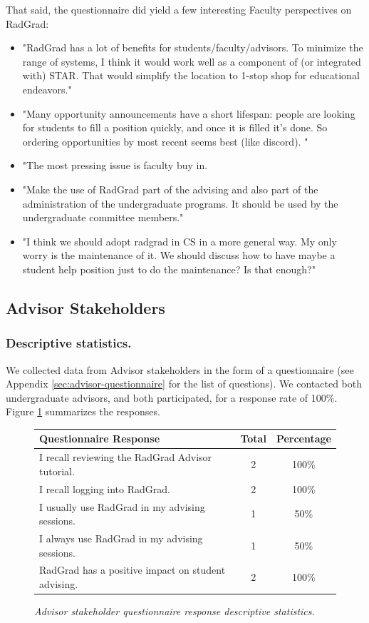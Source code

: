 \documentclass[acmsmall]{acmart}
\begin{document}
That said, the questionnaire did yield a few interesting Faculty perspectives on RadGrad:

\begin{itemize}[leftmargin=*]
\item "RadGrad has a lot of benefits for students/faculty/advisors. To minimize the range of systems, I think it would work well as a component of (or integrated with) STAR. That would simplify the location to 1-stop shop for educational endeavors."
\item "Many opportunity announcements have a short lifespan: people are looking for students to fill a position quickly, and once it is filled it's done. So ordering opportunities by most recent seems best (like discord). "
\item "The most pressing issue is faculty buy in.
\item "Make the use of RadGrad part of the advising and also part of the administration of the undergraduate programs. It should be used by the undergraduate committee members."
\item "I think we should adopt radgrad in CS in a more general way. My only worry is the maintenance of it. We should discuss how to have maybe a student help position just to do the maintenance? Is that enough?"
\end{itemize}

\subsection{Advisor Stakeholders}

\subsubsection{Descriptive statistics.} We collected data from Advisor stakeholders in the form of a questionnaire (see Appendix \ref{sec:advisor-questionnaire} for the list of questions). We contacted both undergraduate advisors, and both participated, for a response rate of 100\%.  Figure \ref{fig:advisor-questionnaire-responses} summarizes the responses.

\begin{figure}[th]
\centering
\small
\begin{tabular}{ p{4in} c c }
\hline
 Questionnaire Response &  Total & Percentage   \\
\hline
I recall reviewing the RadGrad Advisor tutorial. & 2 & 100\% \\
I recall logging into RadGrad.                   & 2 & 100\% \\
I usually use RadGrad in my advising sessions.  & 1 & 50\% \\
I always use RadGrad in my advising sessions.  & 1 & 50\% \\
RadGrad has a positive impact on student advising.  & 2 & 100\% \\
\hline
\end{tabular}
\caption{\em Advisor stakeholder questionnaire response descriptive statistics.}
\normalsize
\label{fig:advisor-questionnaire-responses}
\end{figure}
\end{document}
